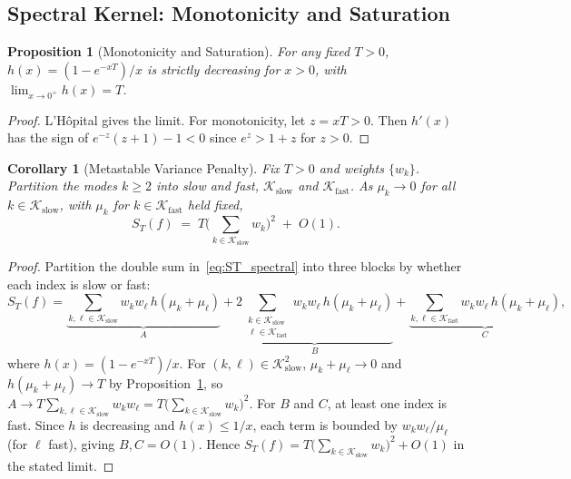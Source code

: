 \documentclass{article}
\newtheorem{proposition}{Proposition}
\newtheorem{corollary}{Corollary}
\begin{document}
\subsection{Spectral Kernel: Monotonicity and Saturation}
\label{app:spectral_kernel}

\begin{proposition}[Monotonicity and Saturation]
\label{prop:monotonicity}
For any fixed $T > 0$, $h(x) = (1 - e^{-xT})/x$ is strictly decreasing for $x > 0$, with $\lim_{x \to 0^+} h(x) = T$.
\end{proposition}
\begin{proof}
L'H\^opital gives the limit. For monotonicity, let $z = xT > 0$. Then $h'(x)$ has the sign of $e^{-z}(z+1) - 1 < 0$ since $e^z > 1+z$ for $z > 0$.
\end{proof}

\begin{corollary}[Metastable Variance Penalty]
\label{cor:metastable_variance}
Fix $T > 0$ and weights $\{w_k\}$. Partition the modes $k \geq 2$ into slow and fast, $\mathcal{K}_{\text{slow}}$ and $\mathcal{K}_{\text{fast}}$. As $\mu_k \to 0$ for all $k \in \mathcal{K}_{\text{slow}}$, with $\mu_k$ for $k \in \mathcal{K}_{\text{fast}}$ held fixed,
\[
S_T(f) \;=\; T\Big(\textstyle\sum_{k \in \mathcal{K}_{\text{slow}}} w_k\Big)^2 \;+\; O(1).
\]
\end{corollary}
\begin{proof}
Partition the double sum in~\eqref{eq:ST_spectral} into three blocks by whether each index is slow or fast:
\[
S_T(f) = \underbrace{\sum_{k,\ell \in \mathcal{K}_{\text{slow}}}\!\!\! w_k w_\ell\, h(\mu_k+\mu_\ell)}_{A}
     + \underbrace{2\!\!\sum_{\substack{k \in \mathcal{K}_{\text{slow}} \\ \ell \in \mathcal{K}_{\text{fast}}}}\!\!\! w_k w_\ell\, h(\mu_k+\mu_\ell)}_{B}
     + \underbrace{\sum_{k,\ell \in \mathcal{K}_{\text{fast}}}\!\!\! w_k w_\ell\, h(\mu_k+\mu_\ell)}_{C},
\]
where $h(x) = (1-e^{-xT})/x$. For $(k,\ell) \in \mathcal{K}_{\text{slow}}^2$, $\mu_k + \mu_\ell \to 0$ and $h(\mu_k+\mu_\ell) \to T$ by Proposition~\ref{prop:monotonicity}, so $A \to T \sum_{k,\ell \in \mathcal{K}_{\text{slow}}} w_k w_\ell = T\big(\sum_{k \in \mathcal{K}_{\text{slow}}} w_k\big)^2$. For $B$ and $C$, at least one index is fast. Since $h$ is decreasing and $h(x) \leq 1/x$, each term is bounded by $w_k w_\ell / \mu_\ell$ (for $\ell$ fast), giving $B, C = O(1)$. Hence $S_T(f) = T\big(\sum_{k \in \mathcal{K}_{\text{slow}}} w_k\big)^2 + O(1)$ in the stated limit.
\end{proof}
\end{document}
